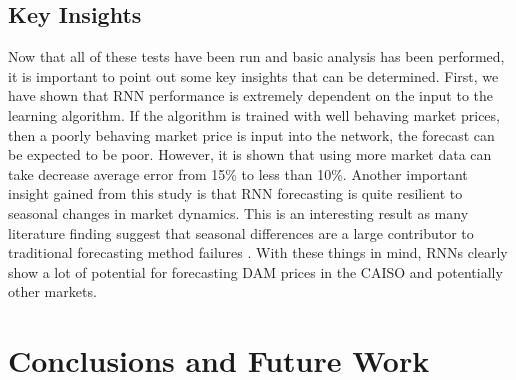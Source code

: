 \documentclass[sigconf]{acmart}
\begin{document}
\subsection{Key Insights}

Now that all of these tests have been run and basic analysis has been performed, it is important to point out some key insights that can be determined. First, we have shown that RNN performance is extremely dependent on the input to the learning algorithm. If the algorithm is trained with well behaving market prices, then a poorly behaving market price is input into the network, the forecast can be expected to be poor. However, it is shown that using more market data can take decrease average error from 15\% to less than 10\%. Another important insight gained from this study is that RNN forecasting is quite resilient to seasonal changes in market dynamics. This is an interesting result as many literature finding suggest that seasonal differences are a large contributor to traditional forecasting method failures \cite{Conejo2005a,Garcia2005}. With these things in mind, RNNs clearly show a lot of potential for forecasting DAM prices in the CAISO and potentially other markets. 

%

\section{Conclusions and Future Work}
\label{sec:conclusions}
\end{document}
